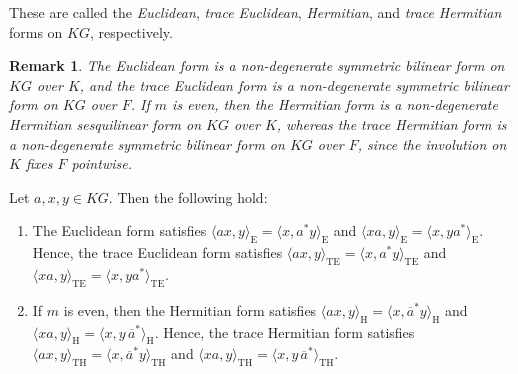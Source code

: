 \documentclass[11pt]{article}
\newtheorem{remark}[theorem]{Remark}
\begin{document}
These are called the \emph{Euclidean}, \emph{trace Euclidean}, \emph{Hermitian}, and \emph{trace Hermitian} forms on $KG$, respectively.





\begin{remark}
The Euclidean form is a non-degenerate symmetric bilinear form on $KG$ over $K$, and the trace Euclidean form is a non-degenerate symmetric bilinear form on $KG$ over $F$. If $m$ is even, then the Hermitian form is a non-degenerate  Hermitian sesquilinear  form on $KG$ over $K$, whereas the trace Hermitian form is a non-degenerate symmetric bilinear form on $KG$ over $F$, since the involution on $K$ fixes $F$ pointwise.
\end{remark}









\begin{lemma}\label{identidad}
Let $a,x,y\in KG$. Then the following hold:
\begin{enumerate}
    \item The Euclidean form satisfies
    $
    \langle ax,y\rangle_{\mathrm{E}}=\langle x,a^\ast y\rangle_{\mathrm{E}}$ and $
    \langle xa,y\rangle_{\mathrm{E}}=\langle x,ya^\ast\rangle_{\mathrm{E}}.
    $
    Hence, the trace Euclidean form satisfies
    $
    \langle ax,y\rangle_{\mathrm{TE}}=\langle x,a^\ast y\rangle_{\mathrm{TE}}$ and $\langle xa,y\rangle_{\mathrm{TE}}=\langle x,ya^\ast\rangle_{\mathrm{TE}}.
    $

    \item If $m$ is even, then the Hermitian form satisfies
    $
    \langle ax,y\rangle_{\mathrm{H}}=\langle x,\overline{a}^\ast y\rangle_{\mathrm{H}}$ and $
    \langle xa,y\rangle_{\mathrm{H}}=\langle x,y\,\overline{a}^\ast\rangle_{\mathrm{H}}.
    $
    Hence, the trace Hermitian form satisfies
    $
    \langle ax,y\rangle_{\mathrm{TH}}=\langle x,\overline{a}^\ast y\rangle_{\mathrm{TH}}$ and $
    \langle xa,y\rangle_{\mathrm{TH}}=\langle x,y\,\overline{a}^\ast\rangle_{\mathrm{TH}}.
    $
\end{enumerate}
\end{lemma}
\end{document}

